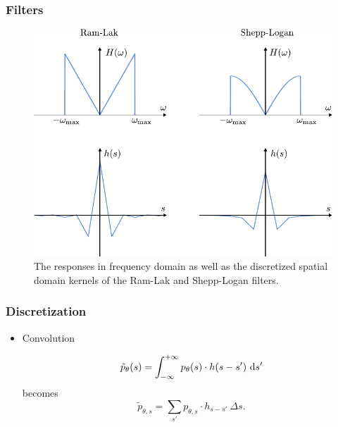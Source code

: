 \begin{frame}
	\frametitle{Filters}

	\begin{figure}[tbp]
		\centering
		\includegraphics[width=0.5\linewidth]{images/analytic_2}
		\caption{The responses in frequency domain as well as the discretized spatial domain kernels of the Ram-Lak and Shepp-Logan filters.}
	\end{figure}
\end{frame}

\begin{frame}
	\frametitle{Discretization}

	\begin{itemize}
		\item Convolution


		      \begin{equation}
			      \tilde{p}_{\theta}(s) = \int_{-\infty}^{+\infty} p_\theta(s) \cdot h(s - s') \ \textnormal d s'
		      \end{equation}
		      becomes
		      \begin{equation}
			      \tilde{p}_{\theta, s} = \sum_{s'} p_{\theta, s} \cdot h_{s - s'}\ \Delta s.
		      \end{equation}

		
	\end{itemize}

\end{frame}


